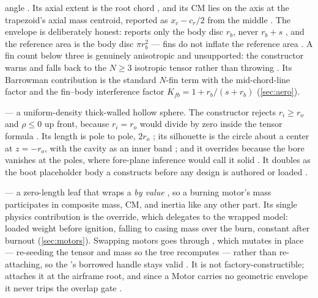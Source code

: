 \begin{description}
  angle . Its axial extent is the root chord
  , and its CM lies on the axis at the trapezoid's axial mass
  centroid, reported as $x_c - c_r/2$ from the middle . The
  envelope is deliberately honest:  reports only the body disc $r_b$,
  never $r_b + s$ , and the reference area is the body disc
  $\pi r_b^2$ --- fins do not inflate the reference area
  . A fin count below three is genuinely anisotropic and
  unsupported: the constructor warns and falls back to the $N \ge 3$ isotropic tensor rather
  than throwing . Its Barrowman contribution is the standard
  $N$-fin term with the mid-chord-line factor and the fin--body interference factor
  $K_{fb} = 1 + r_b/(s + r_b)$  (\cref{sec:aero}).
\item[\code{HollowSphere}] --- a uniform-density thick-walled hollow sphere. The constructor
  rejects $r_i \ge r_o$ and $\rho \le 0$ up front, because $r_i = r_o$ would divide by zero
  inside the tensor formula . Its length is pole to
  pole, $2r_o$ ; its silhouette is the circle about a
  center at $z = -r_o$, with the cavity as an inner band
  ; and it overrides  because the bore
  vanishes at the poles, where fore-plane inference would call it solid
  . It doubles as the boot placeholder body a
   constructs before any design is authored or loaded
  .
\item[\code{Motor}] --- a zero-length leaf that wraps a  \emph{by value}
  , so a burning motor's mass participates in composite mass,
  CM, and inertia like any other part. Its single physics contribution is the
   override, which delegates to the wrapped model: loaded weight before
  ignition, falling to casing mass over the burn, constant after burnout
   (\cref{sec:motors}). Swapping motors goes through
  , which mutates in place --- re-seeding the tensor and mass so the
  tree recomputes --- rather than re-attaching, so the 's borrowed
   handle stays valid . It is not
  factory-constructible;  attaches it at the airframe
  root, and since a Motor carries no geometric envelope it never trips the overlap gate
  .
\end{description}

